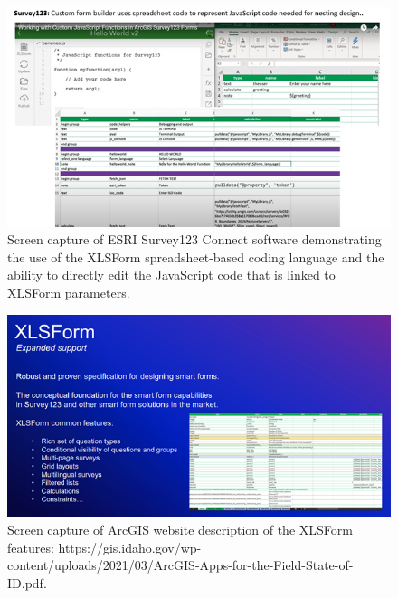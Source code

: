 \documentclass[
]{book}
\theoremstyle{definition}
\theoremstyle{definition}
\theoremstyle{definition}
\theoremstyle{definition}
\theoremstyle{remark}
\begin{document}
\begin{figure}
\includegraphics[width=0.9\linewidth]{figures/survey123/survey123_xlsform} \caption{Screen capture of ESRI Survey123 Connect software demonstrating the use of the XLSForm spreadsheet-based coding language and the ability to directly edit the JavaScript code that is linked to XLSForm parameters.}\label{fig:xlsform}
\end{figure}

\begin{figure}
\includegraphics[width=0.9\linewidth]{figures/survey123/survey123_xlsform2} \caption{Screen capture of ArcGIS website description of the XLSForm features: https://gis.idaho.gov/wp-content/uploads/2021/03/ArcGIS-Apps-for-the-Field-State-of-ID.pdf.}\label{fig:xlsform2}
\end{figure}
\end{document}
